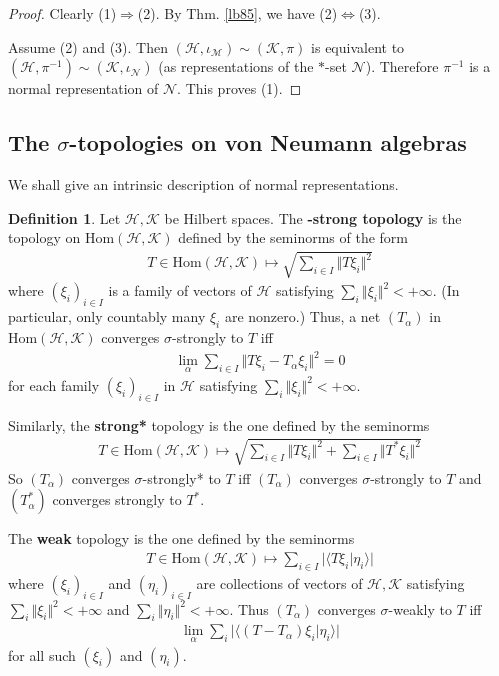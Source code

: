 \documentclass[12pt,b5paper,notitlepage]{article}
\theoremstyle{definition}
\newtheorem{df}{Definition}[section]
\theoremstyle{plain}
\newcommand{\mc}{\mathcal}
\newcommand{\Hom}{\mathrm{Hom}}
\newcommand{\bk}[1]{\langle {#1}\rangle}
\numberwithin{equation}{section}
\begin{document}
\begin{proof}
Clearly (1)$\Rightarrow$(2). By Thm. \ref{lb85}, we have (2)$\Leftrightarrow$(3). 

Assume (2) and (3). Then $(\mc H,\iota_{\mc M})\sim(\mc K,\pi)$ is equivalent to $(\mc H,\pi^{-1})\sim(\mc K,\iota_{\mc N})$ (as representations of the $*$-set $\mc N$). Therefore $\pi^{-1}$ is a normal representation of $\mc N$. This proves (1).
\end{proof}




\subsection*{The $\sigma$-topologies on von Neumann algebras}


We shall give an intrinsic description of normal representations.



\begin{df}
Let $\mc H,\mc K$ be Hilbert spaces. The \pmb{$\sigma$}\textbf{-strong topology} is the topology on $\Hom(\mc H,\mc K)$ defined by the seminorms of the form
\begin{align*}
T\in\Hom(\mc H,\mc K)\mapsto \sqrt{\sum_{i\in I}\Vert T\xi_i\Vert^2}
\end{align*} 
where $(\xi_i)_{i\in I}$ is a family of vectors of $\mc H$ satisfying $\sum_i\Vert\xi_i\Vert^2<+\infty$. (In particular, only countably many $\xi_i$ are nonzero.) Thus, a net $(T_\alpha)$ in $\Hom(\mc H,\mc K)$ converges $\sigma$-strongly to $T$ iff
\begin{align*}
\lim_\alpha \sum_{i\in I}\Vert T\xi_i-T_\alpha\xi_i\Vert^2=0 
\end{align*}
for each family $(\xi_i)_{i\in I}$ in $\mc H$ satisfying $\sum_i\Vert\xi_i\Vert^2<+\infty$.

Similarly, the \pmb{$\sigma$-}\textbf{strong*} topology is the one defined by the seminorms
\begin{align*}
T\in\Hom(\mc H,\mc K)\mapsto \sqrt{\sum_{i\in I}\Vert T\xi_i\Vert^2+\sum_{i\in I}\Vert T^*\xi_i\Vert^2}
\end{align*} 
So $(T_\alpha)$ converges $\sigma$-strongly*  to $T$ iff $(T_\alpha)$ converges $\sigma$-strongly to $T$ and $(T_\alpha^*)$ converges strongly to $T^*$.

The \pmb{$\sigma$-}\textbf{weak} topology is the one defined by the seminorms
\begin{align*}
T\in\Hom(\mc H,\mc K)\mapsto \sum_{i\in I}\big|\bk{T\xi_i|\eta_i}\big|
\end{align*} 
where $(\xi_i)_{i\in I}$ and $(\eta_i)_{i\in I}$ are collections of vectors of $\mc H,\mc K$ satisfying $\sum_i\Vert\xi_i\Vert^2<+\infty$ and $\sum_i\Vert\eta_i\Vert^2<+\infty$. Thus $(T_\alpha)$ converges $\sigma$-weakly to $T$ iff
\begin{align*}
\lim_\alpha\sum_i \big|\bk{(T-T_\alpha)\xi_i|\eta_i}\big|
\end{align*}
for all such $(\xi_i)$ and $(\eta_i)$.  \hfill\qedsymbol
\end{df}
\end{document}
